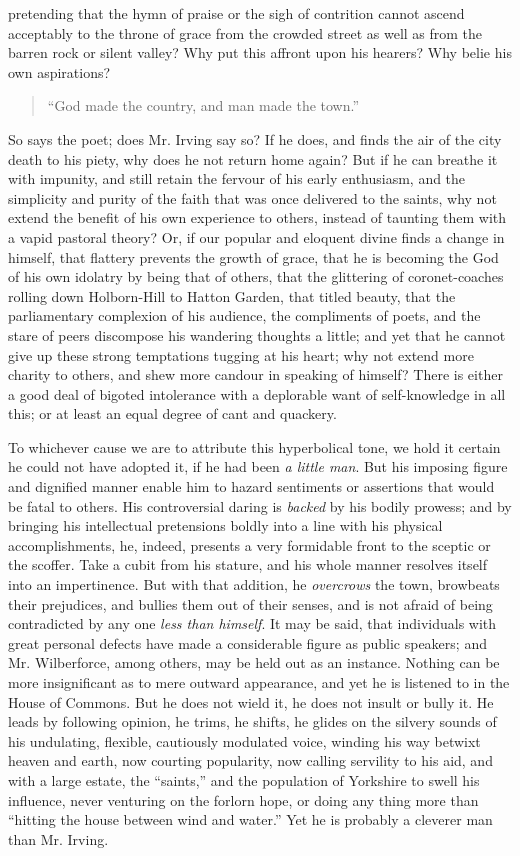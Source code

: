 pretending that the hymn of praise or the sigh of contrition
cannot ascend acceptably to the throne of grace from the crowded
street as well as from the barren rock or silent valley? Why put
this affront upon his hearers? Why belie his own aspirations?
\begin{quote}
  ``God made the country, and man made the town.''
\end{quote}
So says the poet; does Mr. Irving say so? If he does, and finds
the air of the city death to his piety, why does he not return
home again? But if he can breathe it with impunity, and still
retain the fervour of his early enthusiasm, and the simplicity and
purity of the faith that was once delivered to the saints, why not
extend the benefit of his own experience to others, instead of
taunting them with a vapid pastoral theory? Or, if our popular and
eloquent divine finds a change in himself, that flattery prevents
the growth of grace, that he is becoming the God of his own
idolatry by being that of others, that the glittering of
coronet-coaches rolling down Holborn-Hill to Hatton Garden, that
titled beauty, that the parliamentary complexion of his audience,
the compliments of poets, and the stare of peers discompose his
wandering thoughts a little; and yet that he cannot give up these
strong temptations tugging at his heart; why not extend more
charity to others, and shew more candour in speaking of himself?
There is either a good deal of bigoted intolerance with a
deplorable want of self-knowledge in all this; or at least an
equal degree of cant and quackery.

To whichever cause we are to attribute this hyperbolical tone, we
hold it certain he could not have adopted it, if he had been \emph{a
little man}.  But his imposing figure and dignified manner enable
him to hazard sentiments or assertions that would be fatal to
others. His controversial daring is \emph{backed} by his bodily
prowess; and by bringing his intellectual pretensions boldly into
a line with his physical accomplishments, he, indeed, presents a
very formidable front to the sceptic or the scoffer. Take a cubit
from his stature, and his whole manner resolves itself into an
impertinence. But with that addition, he \emph{overcrows} the town,
browbeats their prejudices, and bullies them out of their senses,
and is not afraid of being contradicted by any one \emph{less than
himself}. It may be said, that individuals with great personal
defects have made a considerable figure as public speakers; and
Mr. Wilberforce, among others, may be held out as an
instance. Nothing can be more insignificant as to mere outward
appearance, and yet he is listened to in the House of Commons. But
he does not wield it, he does not insult or bully it. He leads by
following opinion, he trims, he shifts, he glides on the silvery
sounds of his undulating, flexible, cautiously modulated voice,
winding his way betwixt heaven and earth, now courting popularity,
now calling servility to his aid, and with a large estate, the
``saints,'' and the population of Yorkshire to swell his influence,
never venturing on the forlorn hope, or doing any thing more than
``hitting the house between wind and water.'' Yet he is probably a
cleverer man than Mr. Irving.

